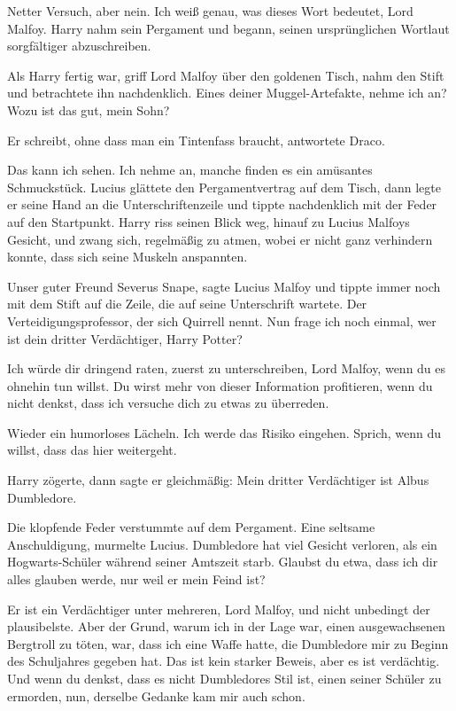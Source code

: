 \glqq Netter Versuch, aber nein. Ich weiß genau, was dieses Wort bedeutet, Lord
Malfoy.\grqq{} Harry nahm sein Pergament und begann, seinen ursprünglichen
Wortlaut sorgfältiger abzuschreiben.

Als Harry fertig war, griff Lord Malfoy über den goldenen Tisch, nahm den Stift
und betrachtete ihn nachdenklich. \glqq Eines deiner Muggel-Artefakte, nehme ich
an? Wozu ist das gut, mein Sohn?\grqq{}

\glqq Er schreibt, ohne dass man ein Tintenfass braucht\grqq{}, antwortete
Draco.

\glqq Das kann ich sehen. Ich nehme an, manche finden es ein amüsantes
Schmuckstück.\grqq{} Lucius glättete den Pergamentvertrag auf dem Tisch, dann
legte er seine Hand an die Unterschriftenzeile und tippte nachdenklich mit der
Feder auf den Startpunkt. Harry riss seinen Blick weg, hinauf zu Lucius Malfoys
Gesicht, und zwang sich, regelmäßig zu atmen, wobei er nicht ganz verhindern
konnte, dass sich seine Muskeln anspannten.

\glqq Unser guter Freund Severus Snape\grqq{}, sagte Lucius Malfoy und tippte
immer noch mit dem Stift auf die Zeile, die auf seine Unterschrift wartete.
\glqq Der Verteidigungsprofessor, der sich Quirrell nennt. Nun frage ich noch
einmal, wer ist dein dritter Verdächtiger, Harry Potter?\grqq{}

\glqq Ich würde dir dringend raten, zuerst zu unterschreiben, Lord Malfoy, wenn
du es ohnehin tun willst. Du wirst mehr von dieser Information profitieren, wenn
du nicht denkst, dass ich versuche dich zu etwas zu überreden.\grqq{}

Wieder ein humorloses Lächeln. \glqq Ich werde das Risiko eingehen. Sprich, wenn
du willst, dass das hier weitergeht.\grqq{}

Harry zögerte, dann sagte er gleichmäßig: \glqq Mein dritter Verdächtiger ist
Albus Dumbledore.\grqq{}

Die klopfende Feder verstummte auf dem Pergament. \glqq Eine seltsame
Anschuldigung\grqq{}, murmelte Lucius. \glqq Dumbledore hat viel Gesicht
verloren, als ein Hogwarts-Schüler während seiner Amtszeit starb. Glaubst du
etwa, dass ich dir alles glauben werde, nur weil er mein Feind ist?\grqq{}

\glqq Er ist ein Verdächtiger unter mehreren, Lord Malfoy, und nicht unbedingt
der plausibelste. Aber der Grund, warum ich in der Lage war, einen
ausgewachsenen Bergtroll zu töten, war, dass ich eine Waffe hatte, die
Dumbledore mir zu Beginn des Schuljahres gegeben hat. Das ist kein starker
Beweis, aber es ist verdächtig. Und wenn du denkst, dass es nicht Dumbledores
Stil ist, einen seiner Schüler zu ermorden, nun, derselbe Gedanke kam mir auch
schon.\grqq{}

